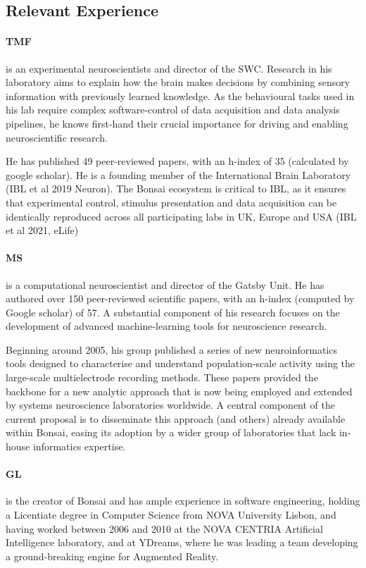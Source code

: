 
\subsection{Relevant Experience}

\paragraph{TMF} is an experimental
neuroscientists and director of the SWC. Research in his laboratory aims to
explain how the brain makes decisions by combining sensory information with
previously learned knowledge. As the behavioural tasks used in his lab require
complex software-control of data acquisition and data analysis pipelines, he
knows first-hand their crucial importance for driving and enabling
neuroscientific research.

He has published 49 peer-reviewed papers, with an h-index of 35 (calculated by
google scholar).  He is a founding member of the International Brain Laboratory
(IBL et al 2019 Neuron). The Bonsai ecosystem is critical to IBL, as it ensures
that experimental control, stimulus presentation and data acquisition can be
identically reproduced across all participating labs in UK, Europe and USA (IBL
et al 2021, eLife)

\paragraph{MS} is a computational neuroscientist and director of the Gatsby
Unit. He has authored over 150 peer-reviewed scientific papers, with an h-index
(computed by Google scholar) of 57. A substantial component of his research
focuses on the development of advanced machine-learning tools for
neuroscience research.

Beginning around 2005, his group published a series of new neuroinformatics
tools designed to characterise and understand population-scale activity using
the large-scale multielectrode recording methods. These papers
provided the backbone for a new analytic approach that is now being employed
and extended by systems neuroscience laboratories worldwide.
%
A central component of the current proposal is to disseminate this approach
(and others) already available within Bonsai, easing its adoption by a wider
group of laboratories that lack in-house informatics expertise.

\paragraph{GL} is the creator of Bonsai and has ample experience in software
engineering, holding a Licentiate degree in Computer Science from NOVA
University Lisbon, and having worked between 2006 and 2010 at the NOVA CENTRIA
Artificial Intelligence laboratory, and at YDreams, where he was leading a team
developing a ground-breaking engine for Augmented Reality.

